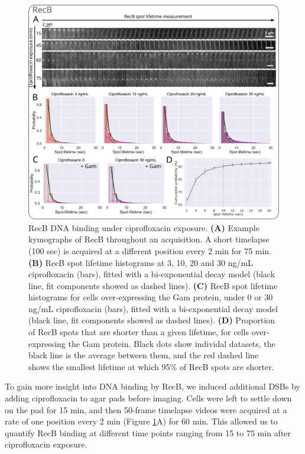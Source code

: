 \begin{figure}[htbp]
    \centering
    \includegraphics[width=.8\textwidth]{Figures/Fig2_cipro_nSpots.pdf}
    \caption{RecB DNA binding under ciprofloxacin exposure. \textbf{(A)} Example kymographs of RecB throughout an acquisition. A short timelapse (100 sec) is acquired at a different position every 2 min for 75 min. \textbf{(B)} RecB spot lifetime histograms at 3, 10, 20 and 30 ng/mL ciprofloxacin (bars), fitted with a bi-exponential decay model (black line, fit components showed as dashed lines). \textbf{(C)} RecB spot lifetime histograms for cells over-expressing the Gam protein, under 0 or 30 ng/mL ciprofloxacin (bars), fitted with a bi-exponential decay model (black line, fit components showed as dashed lines). \textbf{(D)} Proportion of RecB spots that are shorter than a given lifetime, for cells over-expressing the Gam protein. Black dots show individal datasets, the black line is the average between them, and the red dashed line shows the smallest lifetime at which 95\% of RecB spots are shorter.}
    \label{Fig:lifetime_fits}
\end{figure}

To gain more insight into DNA binding by RecB, we induced additional DSBs by adding ciprofloxacin to agar pads before imaging. Cells were left to settle down on the pad for 15 min, and then 50-frame timelapse videos were acquired at a rate of one position every 2 min (Figure \ref{Fig:lifetime_fits}A) for 60 min. This allowed us to quantify RecB binding at different time points ranging from 15 to 75 min after ciprofloxacin exposure.

